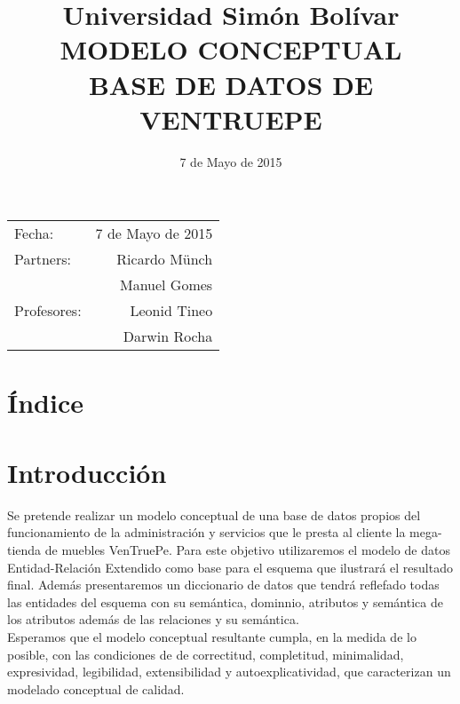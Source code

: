 \documentclass{article}
\title{ Universidad Sim\'on Bol\'ivar \\  MODELO CONCEPTUAL \\ BASE DE DATOS DE VENTRUEPE \\} %
\date{7 de Mayo de 2015} %
\begin{document}
\maketitle %

\begin{center}
\begin{tabular}{l r}
Fecha: & 7 de Mayo de 2015 \\ %
Partners: & Ricardo M\"unch  \\ %
& Manuel Gomes \\
Profesores: & Leonid Tineo \\
& Darwin Rocha %
\end{tabular}
\end{center}

\clearpage


\section{\'Indice}



\clearpage

\section{Introducci\'on}


Se pretende realizar un modelo conceptual de una base de datos propios del funcionamiento de la administración y servicios que le presta al cliente la mega-tienda de muebles VenTruePe. Para este objetivo utilizaremos el modelo de datos Entidad-Relaci\'on Extendido como base para el esquema que ilustrar\'a el resultado final. Adem\'as presentaremos un diccionario de datos que tendr\'a reflefado todas las entidades del esquema con su sem\'antica, dominnio, atributos y sem\'antica de los atributos adem\'as de las relaciones y su sem\'antica.
\\

Esperamos que el modelo conceptual resultante cumpla, en la medida de lo posible, con las condiciones de de correctitud, completitud, minimalidad, expresividad, legibilidad, extensibilidad y autoexplicatividad, que caracterizan un modelado conceptual de calidad.
\end{document}
